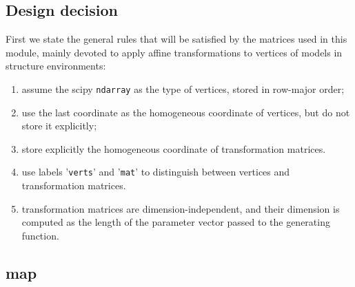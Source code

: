 \documentclass[11pt,oneside]{article}	%
\begin{document}
\subsection{Design decision}
First we state the general rules that will be satisfied by the matrices used in this module, mainly devoted to apply affine transformations to vertices of models in structure environments:
\begin{enumerate}
\item assume the scipy \texttt{ndarray} as the type of vertices, stored in row-major order;
\item use the last coordinate as the homogeneous coordinate of vertices, but do not store it explicitly;
\item store explicitly the homogeneous coordinate of transformation matrices.
\item use labels '\texttt{verts}' and '\texttt{mat}' to distinguish between vertices and transformation matrices.
\item transformation matrices are dimension-independent, and their dimension is computed as the length of the parameter vector passed to the generating function.
\end{enumerate}


\subsection{map}
\end{document}
